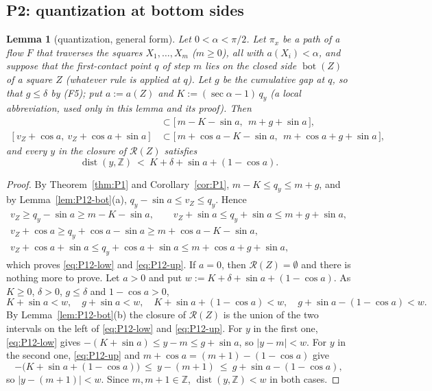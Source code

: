 \documentclass[11pt]{amsart}
\newcommand{\Z}{\mathbb Z}
\newcommand{\cR}{\mathcal R}
\newcommand{\Bot}{\operatorname{bot}}
\newcommand{\dist}{\operatorname{dist}}
\newtheorem{lemma}[theorem]{Lemma}
\theoremstyle{definition}
\theoremstyle{remark}
\numberwithin{equation}{section}
\begin{document}
\subsection{P2: quantization at bottom sides}\label{ssec:P12-P2}

\begin{lemma}[quantization, general form]\label{lem:P12-core}
Let $0<\alpha<\pi/2$. Let $\pi_x$ be a path of a flow $F$ that traverses the squares $X_1,\dots,X_m$ \textup{(}$m\ge0$\textup{)}, all with $a(X_i)<\alpha$, and suppose that the first-contact point $q$ of step $m$ lies on the closed side $\Bot(Z)$ of a square $Z$ \textup{(}whatever rule is applied at $q$\textup{)}. Let $g$ be the cumulative gap at $q$, so that $g\le\delta$ by \textup{(F5)}; put $a:=a(Z)$ and $K:=(\sec\alpha-1)\,q_y$ \textup{(}a local abbreviation, used only in this lemma and its proof\textup{)}. Then
\begin{align}
[v_Z,\ v_Z+\sin a]&\subset\bigl[\,m-K-\sin a,\ \ m+g+\sin a\,\bigr],\label{eq:P12-low}\\
[v_Z+\cos a,\ v_Z+\cos a+\sin a]&\subset\bigl[\,m+\cos a-K-\sin a,\ \ m+\cos a+g+\sin a\,\bigr],\label{eq:P12-up}
\end{align}
and every $y$ in the closure of $\cR(Z)$ satisfies
\[
\dist(y,\Z)\ <\ K+\delta+\sin a+(1-\cos a).
\]
\end{lemma}

\begin{proof}
By Theorem~\ref{thm:P1} and Corollary~\ref{cor:P1}, $m-K\le q_y\le m+g$, and by Lemma~\ref{lem:P12-bot}(a), $q_y-\sin a\le v_Z\le q_y$. Hence
\begin{gather*}
v_Z\ge q_y-\sin a\ge m-K-\sin a,\qquad v_Z+\sin a\le q_y+\sin a\le m+g+\sin a,\\
v_Z+\cos a\ge q_y+\cos a-\sin a\ge m+\cos a-K-\sin a,\\
v_Z+\cos a+\sin a\le q_y+\cos a+\sin a\le m+\cos a+g+\sin a,
\end{gather*}
which proves \eqref{eq:P12-low} and \eqref{eq:P12-up}. If $a=0$, then $\cR(Z)=\emptyset$ and there is nothing more to prove. Let $a>0$ and put $w:=K+\delta+\sin a+(1-\cos a)$. As $K\ge0$, $\delta>0$, $g\le\delta$ and $1-\cos a>0$,
\[
K+\sin a<w,\quad g+\sin a<w,\quad K+\sin a+(1-\cos a)<w,\quad g+\sin a-(1-\cos a)<w .
\]
By Lemma~\ref{lem:P12-bot}(b) the closure of $\cR(Z)$ is the union of the two intervals on the left of \eqref{eq:P12-low} and \eqref{eq:P12-up}. For $y$ in the first one, \eqref{eq:P12-low} gives $-(K+\sin a)\le y-m\le g+\sin a$, so $|y-m|<w$. For $y$ in the second one, \eqref{eq:P12-up} and $m+\cos a=(m+1)-(1-\cos a)$ give
\[
-\bigl(K+\sin a+(1-\cos a)\bigr)\ \le\ y-(m+1)\ \le\ g+\sin a-(1-\cos a),
\]
so $|y-(m+1)|<w$. Since $m,m+1\in\Z$, $\dist(y,\Z)<w$ in both cases.
\end{proof}
\end{document}
